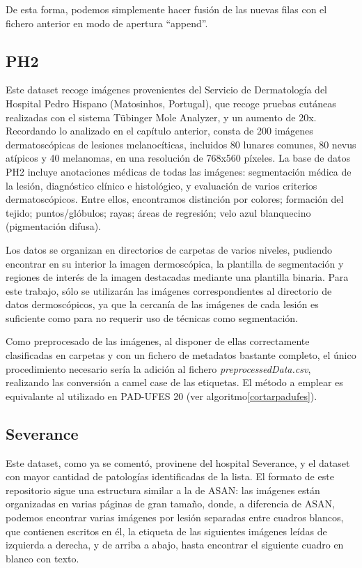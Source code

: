 De esta forma, podemos simplemente hacer fusión de las nuevas filas con el fichero anterior en modo de apertura ``append''.

\subsection{PH2}

Este dataset recoge imágenes provenientes del Servicio de Dermatología del Hospital Pedro Hispano (Matosinhos, Portugal), que recoge pruebas cutáneas realizadas con el sistema Tübinger Mole Analyzer, y un aumento de 20x. Recordando lo analizado en el capítulo anterior, consta de 200 imágenes dermatoscópicas de lesiones melanocíticas, incluidos 80 lunares comunes, 80 nevus atípicos y 40 melanomas, en una resolución de 768x560 píxeles. La base de datos PH2 incluye anotaciones médicas de todas las imágenes: segmentación médica de la lesión, diagnóstico clínico e histológico, y evaluación de varios criterios dermatoscópicos. Entre ellos, encontramos distinción por colores; formación del tejido; puntos/glóbulos; rayas; áreas de regresión; velo azul blanquecino (pigmentación difusa).

Los datos se organizan en directorios de carpetas de varios niveles,  pudiendo encontrar en su interior la imagen dermoscópica, la plantilla de segmentación y regiones de interés de la imagen destacadas mediante una plantilla binaria. Para este trabajo, sólo se utilizarán las imágenes correspondientes al directorio de datos dermoscópicos, ya que la cercanía de las imágenes de cada lesión es suficiente como para no requerir uso de técnicas como segmentación.

Como preprocesado de las imágenes, al disponer de ellas correctamente clasificadas en carpetas y con un fichero de metadatos bastante completo, el único procedimiento necesario sería la adición al fichero \textit{preprocessedData.csv}, realizando las conversión a camel case de las etiquetas. El método a emplear es equivalante al utilizado en PAD-UFES 20 (ver algoritmo\ref{cortarpadufes}).

 \subsection{Severance}
 
 Este dataset, como ya se comentó, provinene del hospital Severance, y el dataset con mayor cantidad de patologías identificadas de la lista. El formato de este repositorio sigue una estructura similar a la de ASAN: las imágenes están organizadas en varias páginas de gran tamaño, donde, a diferencia de ASAN, podemos encontrar varias imágenes por lesión separadas entre cuadros blancos, que contienen escritos en él, la etiqueta de las siguientes imágenes leídas de izquierda a derecha, y de arriba a abajo, hasta encontrar el siguiente cuadro en blanco con texto.
 
